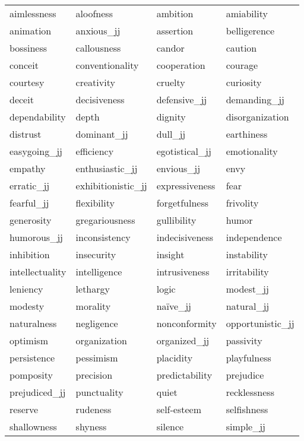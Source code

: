\documentclass[eric_thesis.tex]{subfiles}
\begin{document}
\begin{table}[tbp]
    \begin{tabular}{| llll |}
        \hline
        aimlessness & aloofness & ambition & amiability \\
        animation & anxious\_jj & assertion & belligerence \\
        bossiness & callousness & candor & caution \\
        conceit & conventionality & cooperation & courage \\
        courtesy & creativity & cruelty & curiosity \\
        deceit & decisiveness & defensive\_jj & demanding\_jj \\
        dependability & depth & dignity & disorganization \\
        distrust & dominant\_jj & dull\_jj & earthiness \\
        easygoing\_jj & efficiency & egotistical\_jj & emotionality \\
        empathy & enthusiastic\_jj & envious\_jj & envy \\
        erratic\_jj & exhibitionistic\_jj & expressiveness & fear \\
        fearful\_jj & flexibility & forgetfulness & frivolity \\
        generosity & gregariousness & gullibility & humor \\
        humorous\_jj & inconsistency & indecisiveness & independence \\
        inhibition & insecurity & insight & instability \\
        intellectuality & intelligence & intrusiveness & irritability \\
        leniency & lethargy & logic & modest\_jj \\
        modesty & morality & naïve\_jj & natural\_jj \\
        naturalness & negligence & nonconformity & opportunistic\_jj \\
        optimism & organization & organized\_jj & passivity \\
        persistence & pessimism & placidity & playfulness \\
        pomposity & precision & predictability & prejudice \\
        prejudiced\_jj & punctuality & quiet & recklessness \\
        reserve & rudeness & self-esteem & selfishness \\
        shallowness & shyness & silence & simple\_jj \\

\end{tabular}
\end{table}
\end{document}
